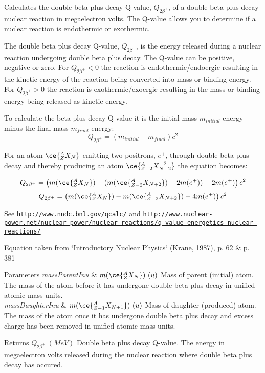 Calculates the double beta plus decay Q-\/value, $Q_{2\beta^+}$, of a double beta plus decay nuclear reaction in megaelectron volts. The Q-\/value allows you to determine if a nuclear reaction is endothermic or exothermic. 

The double beta plus decay Q-\/value, $Q_{2\beta^+}$, is the energy released during a nuclear reaction undergoing double beta plus decay. The Q-\/value can be positive, negative or zero. For $Q_{2\beta^+} < 0$ the reaction is endothermic/endoergic resulting in the kinetic energy of the reaction being converted into mass or binding energy. For $Q_{2\beta^+} > 0$ the reaction is exothermic/exoergic resulting in the mass or binding energy being released as kinetic energy.

To calculate the beta plus decay Q-\/value it is the initial mass $m_{initial}$ energy minus the final mass $m_{final}$ energy\+: \[Q_{2\beta^+} = \left ( m_{initial}-m_{final}\right ) c^2\]

For an atom $\ce{ ^{A}_{Z}X_{N} }$ emitting two positrons, $e^+$, through double beta plus decay and thereby producing an atom $\ce{ ^{A}_{Z{-2}}X^{-2}_{N{+2}} }$ the equation becomes\+:

\[Q_{2\beta^+} = \left ( m(\ce{ ^{A}_{Z}X_{N} }) - (m(\ce{ ^{A}_{Z{-2}}X_{N{+2}} }) + 2m(e^+)) - 2m(e^+)\right ) c^2\] \[Q_{2\beta^+} = \left ( m(\ce{ ^{A}_{Z}X_{N} }) - m(\ce{ ^{A}_{Z{-2}}X_{N{+2}} }) - 4m(e^+)\right ) c^2\]

See \href{http://www.nndc.bnl.gov/qcalc/}{\tt http\+://www.\+nndc.\+bnl.\+gov/qcalc/} and \href{http://www.nuclear-power.net/nuclear-power/nuclear-reactions/q-value-energetics-nuclear-reactions/}{\tt http\+://www.\+nuclear-\/power.\+net/nuclear-\/power/nuclear-\/reactions/q-\/value-\/energetics-\/nuclear-\/reactions/}

Equation taken from \char`\"{}\+Introductory Nuclear Physics\char`\"{} (Krane, 1987), p. 62 \& p. 381


\begin{DoxyParams}{Parameters}
{\em mass\+Parent\+Inu} & $m(\ce{ ^{A}_{Z}X_{N} })\ (u)$ Mass of parent (initial) atom. The mass of the atom before it has undergone double beta plus decay in unified atomic mass units. \\
\hline
{\em mass\+Daughter\+Inu} & $m(\ce{ ^{A}_{Z{-1}}X_{N{+1}} })\ (u)$ Mass of daughter (produced) atom. The mass of the atom once it has undergone double beta plus decay and excess charge has been removed in unified atomic mass units. \\
\hline
\end{DoxyParams}
\begin{DoxyReturn}{Returns}
$Q_{2\beta^+}\ (MeV)$ Double beta plus decay Q-\/value. The energy in megaelectron volts released during the nuclear reaction where double beta plus decay has occured. 
\end{DoxyReturn}
\mbox{\label{group___e_g_x_phys-_q_value_gae25e179b76580bc6af7fa4bdf938ba4e}} 
